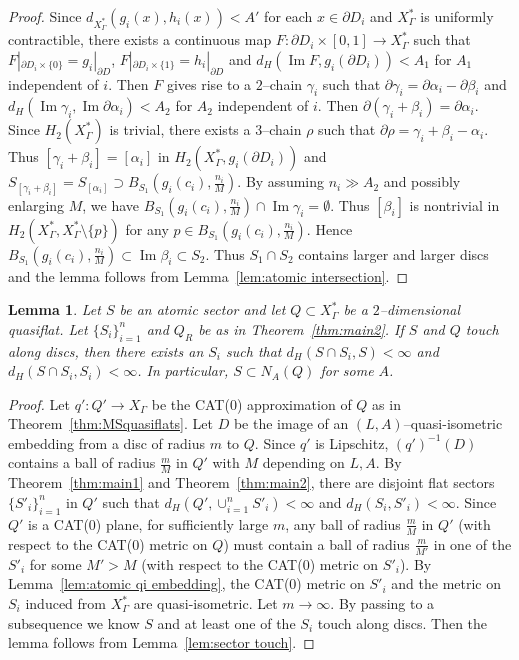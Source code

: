 \documentclass[11pt]{amsart}
\newtheorem{lemma}[theorem]{Lemma}
\theoremstyle{definition}
\newcommand{\Xa}{X^{\ast}}
\newcommand{\im}{\operatorname{Im}}
\begin{document}
\begin{proof}
Since $d_{\Xa_\Gamma}(g_i(x),h_i(x))<A'$ for each $x\in\partial D_i$ and $\Xa_\Gamma$ is uniformly contractible, there exists a continuous map $F\colon \partial D_i\times [0,1]\to \Xa_\Gamma$ such that $F|_{\partial D_i\times\{0\}}=g_i|_{\partial D}$, $F|_{\partial D_i\times\{1\}}=h_i|_{\partial D}$ and $d_H(\im F, g_i(\partial D_i))<A_1$ for $A_1$ independent of $i$. Then $F$ gives rise to a $2$--chain $\gamma_i$ such that $\partial \gamma_i=\partial\alpha_i-\partial\beta_i$ and $d_H(\im \gamma_i,\im \partial\alpha_i)<A_2$ for $A_2$ independent of $i$. Then $\partial (\gamma_i+\beta_i)=\partial\alpha_i$. Since $H_2(\Xa_\Gamma)$ is trivial, there exists a $3$--chain $\rho$ such that $\partial\rho=\gamma_i+\beta_i-\alpha_i$. Thus $[\gamma_i+\beta_i]=[\alpha_i]$ in $H_2(\Xa_\Gamma,g_i(\partial D_i))$ and $S_{[\gamma_i+\beta_i]}=S_{[\alpha_i]}\supset B_{S_1}(g_i(c_i),\frac{n_i}{M})$. By assuming $n_i\gg A_2$ and possibly enlarging $M$, we have $B_{S_1}(g_i(c_i),\frac{n_i}{M})\cap \im\gamma_i=\emptyset$. Thus $[\beta_i]$ is nontrivial in $H_2(\Xa_\Gamma,\Xa_\Gamma\setminus\{p\})$ for any $p\in B_{S_1}(g_i(c_i),\frac{n_i}{M})$. Hence $B_{S_1}(g_i(c_i),\frac{n_i}{M})\subset \im\beta_i\subset S_2$. Thus $S_1\cap S_2$ contains larger and larger discs and the lemma follows from Lemma~\ref{lem:atomic intersection}.
\end{proof}

\begin{lemma}
	\label{lem:sector quasiflat touch}
Let $S$ be an atomic sector and let $Q\subset\Xa_\Gamma$ be a $2$--dimensional quasiflat. Let $\{S_i\}_{i=1}^{n}$ and $Q_R$ be as in Theorem~\ref{thm:main2}. If $S$ and $Q$ touch along discs, then there exists an $S_i$ such that $d_H(S\cap S_i,S)<\infty$ and $d_H(S\cap S_i,S_i)<\infty$. In particular, $S\subset N_A(Q)$ for some $A$.
\end{lemma}

\begin{proof}
Let $q'\colon Q'\to X_\Gamma$ be the CAT(0) approximation of $Q$ as in Theorem~\ref{thm:MSquasiflats}. Let $D$ be the image of an $(L,A)$--quasi-isometric embedding from a disc of radius $m$ to $Q$. Since $q'$ is Lipschitz, $(q')^{-1}(D)$ contains a ball of radius $\frac{m}{M}$ in $Q'$ with $M$ depending on $L,A$. By Theorem~\ref{thm:main1} and Theorem~\ref{thm:main2}, there are disjoint flat sectors $\{S'_i\}_{i=1}^n$ in $Q'$ such that $d_H(Q',\cup_{i=1}^{n}S'_i)<\infty$ and $d_H(S_i,S'_i)<\infty$. Since $Q'$ is a CAT(0) plane, for sufficiently large $m$, any ball of radius $\frac{m}{M}$ in $Q'$ (with respect to the CAT(0) metric on $Q$) must contain a ball of radius $\frac{m}{M'}$ in one of the $S'_i$ for some $M'>M$ (with respect to the CAT(0) metric on $S'_i$). By Lemma~\ref{lem:atomic qi embedding}, the CAT(0) metric on $S'_i$ and the metric on $S_i$ induced from $\Xa_\Gamma$ are quasi-isometric. Let $m\to\infty$. By passing to a subsequence we know $S$ and at least one of the $S_i$ touch along discs. Then the lemma follows from Lemma~\ref{lem:sector touch}.
\end{proof}
\end{document}

